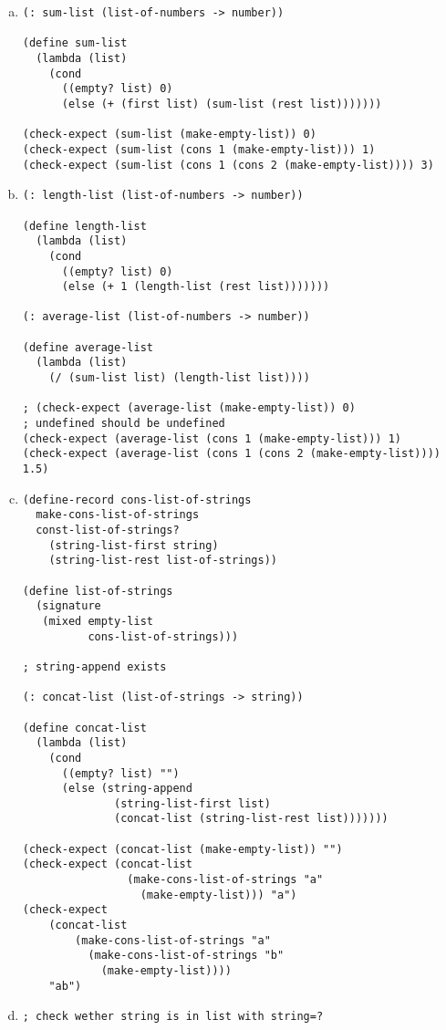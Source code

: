 \documentclass[a4paper,12pt]{article}
\begin{document}
\begin{enumerate}[a)]
  \item \begin{verbatim}
(: sum-list (list-of-numbers -> number))

(define sum-list
  (lambda (list)
    (cond
      ((empty? list) 0)
      (else (+ (first list) (sum-list (rest list)))))))

(check-expect (sum-list (make-empty-list)) 0)
(check-expect (sum-list (cons 1 (make-empty-list))) 1)
(check-expect (sum-list (cons 1 (cons 2 (make-empty-list)))) 3)
\end{verbatim}
  \item \begin{verbatim}
(: length-list (list-of-numbers -> number))

(define length-list
  (lambda (list)
    (cond
      ((empty? list) 0)
      (else (+ 1 (length-list (rest list)))))))

(: average-list (list-of-numbers -> number))

(define average-list
  (lambda (list)
    (/ (sum-list list) (length-list list))))

; (check-expect (average-list (make-empty-list)) 0)
; undefined should be undefined
(check-expect (average-list (cons 1 (make-empty-list))) 1)
(check-expect (average-list (cons 1 (cons 2 (make-empty-list)))) 1.5)
\end{verbatim}
  \item \begin{verbatim}
(define-record cons-list-of-strings
  make-cons-list-of-strings
  const-list-of-strings?
    (string-list-first string)
    (string-list-rest list-of-strings))

(define list-of-strings
  (signature
   (mixed empty-list
          cons-list-of-strings)))

; string-append exists

(: concat-list (list-of-strings -> string))

(define concat-list
  (lambda (list)
    (cond
      ((empty? list) "")
      (else (string-append
              (string-list-first list)
              (concat-list (string-list-rest list)))))))

(check-expect (concat-list (make-empty-list)) "")
(check-expect (concat-list
                (make-cons-list-of-strings "a"
                  (make-empty-list))) "a")
(check-expect
    (concat-list
        (make-cons-list-of-strings "a"
          (make-cons-list-of-strings "b"
            (make-empty-list))))
    "ab")
\end{verbatim}
  \item \begin{verbatim}
; check wether string is in list with string=?


\end{verbatim}
\end{enumerate}
\end{document}
